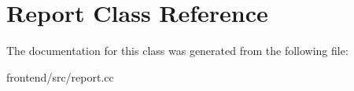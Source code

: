 \hypertarget{classReport}{\section{Report Class Reference}
\label{classReport}
}


The documentation for this class was generated from the following file\-:\begin{DoxyCompactItemize}
\item 
frontend/src/report.\-cc\end{DoxyCompactItemize}
